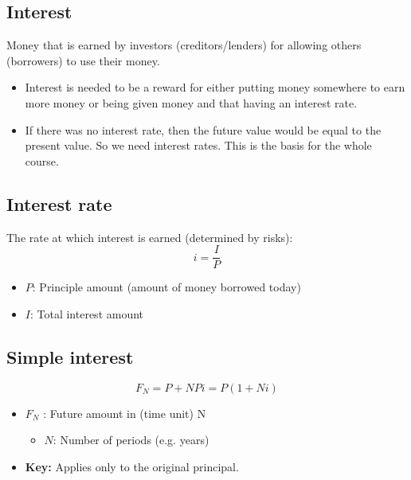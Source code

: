\subsection{Interest}
\begin{definition}
    Money that is earned by investors (creditors/lenders) for allowing others (borrowers) to use their money.
\end{definition}

\begin{intuition}
    \begin{itemize}
        \item Interest is needed to be a reward for either putting money somewhere to earn more money or being given money and that having an interest rate. 
        \item If there was no interest rate, then the future value would be equal to the present value. So we need interest rates. This is the basis for the whole course.
    \end{itemize}
\end{intuition}

\subsection{Interest rate}
\begin{definition}
    The rate at which interest is earned (determined by risks):
    \begin{equation}
        i = \frac{I}{P}
    \end{equation}
    \begin{itemize}
        \item \(P\): Principle amount (amount of money borrowed today)
        \item \(I\): Total interest amount 
    \end{itemize}
\end{definition}

\subsection{Simple interest}
\begin{definition}
    \begin{equation}
        F_N = P + NPi = P(1 + Ni)
    \end{equation}
    \begin{itemize}
        \item \(F_N\) : Future amount in (time unit) N
        \begin{itemize}
            \item \(N\): Number of periods (e.g. years)
        \end{itemize}
        \item \textbf{Key:} Applies only to the original principal.
    \end{itemize}
\end{definition}

